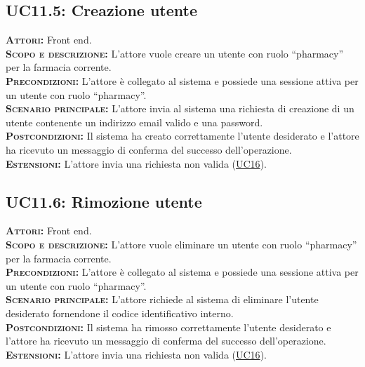 \subsection{UC11.5: Creazione utente}
\label{sec:UC115}
\textsc{\textbf{Attori:}} Front end.\\
\textsc{\textbf{Scopo e descrizione:}} L'attore vuole creare un utente con ruolo ``pharmacy'' per la farmacia corrente.\\
\textsc{\textsc{\textbf{Precondizioni:}}} L'attore è collegato al sistema e possiede una sessione attiva per un utente con ruolo ``pharmacy''.\\
\textsc{\textbf{Scenario principale:}} L'attore invia al sistema una richiesta di creazione di un utente contenente un indirizzo email valido e una password.\\
\textsc{\textbf{Postcondizioni:}} Il sistema ha creato correttamente l'utente desiderato e l'attore ha ricevuto un messaggio di conferma del successo dell'operazione.\\
\textsc{\textbf{Estensioni:}} L'attore invia una richiesta non valida (\hyperref[sec:UC16]{UC16}).

\subsection{UC11.6: Rimozione utente}
\label{sec:UC116}
\textsc{\textbf{Attori:}} Front end.\\
\textsc{\textbf{Scopo e descrizione:}} L'attore vuole eliminare un utente con ruolo ``pharmacy'' per la farmacia corrente.\\
\textsc{\textsc{\textbf{Precondizioni:}}} L'attore è collegato al sistema e possiede una sessione attiva per un utente con ruolo ``pharmacy''.\\
\textsc{\textbf{Scenario principale:}} L'attore richiede al sistema di eliminare l'utente desiderato fornendone il codice identificativo interno.\\
\textsc{\textbf{Postcondizioni:}} Il sistema ha rimosso correttamente l'utente desiderato e l'attore ha ricevuto un messaggio di conferma del successo dell'operazione.\\
\textsc{\textbf{Estensioni:}} L'attore invia una richiesta non valida (\hyperref[sec:UC16]{UC16}).

